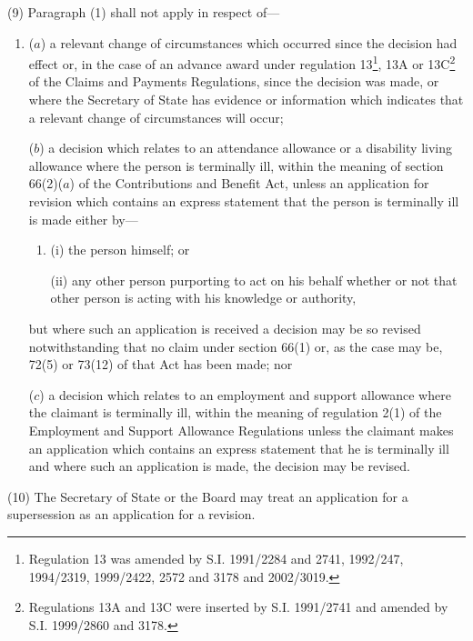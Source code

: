 \documentclass[12pt,a4paper]{article}
\begin{document}
(9) Paragraph (1) shall not apply in respect of—
\begin{enumerate}\item[]
($a$) a relevant change of circumstances which occurred since the decision 
had effect  %
or, in the case of an advance award under regulation 13\footnote{Regulation 13 was amended by S.I. 1991/2284 and 2741, 1992/247, 1994/2319, 1999/2422, 2572 and 3178 and 2002/3019.}, 13A or 13C\footnote{Regulations 13A and 13C were inserted by S.I. 1991/2741 and amended by S.I. 1999/2860 and 3178.} of the Claims and Payments Regulations, since the decision was made,  %
or where the Secretary of State has evidence or information which indicates that a relevant change of circumstances will occur; 

($b$) a decision which relates to an attendance allowance or a disability living allowance where the person is terminally ill, within the meaning of section 66(2)($a$) of the Contributions and Benefit Act, unless an application for revision which contains an express statement that the person is terminally ill is made either by—
\begin{enumerate}\item[]
(i) the person himself; or

(ii) any other person purporting to act on his behalf whether or not that other person is acting with his knowledge or authority,
\end{enumerate}
but where such an application is received a decision may be so revised notwithstanding that no claim under section 66(1) or, as the case may be, 72(5) or 73(12) of that Act has been made;
%
nor

($c$) a decision which relates to an employment and support allowance where the claimant is terminally ill, within the meaning of regulation 2(1) of the Employment and Support Allowance Regulations unless the claimant makes an application which contains an express statement that he is terminally ill and where such an application is made, the decision may be revised.
\end{enumerate}

(10) The Secretary of State 
or the Board  %
may treat an application for a supersession as an application for a revision.
\end{document}
